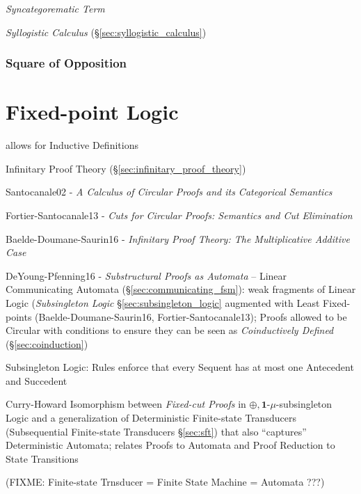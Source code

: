 \emph{Syncategorematic Term}

\emph{Syllogistic Calculus} (\S\ref{sec:syllogistic_calculus})



\subsubsection{Square of Opposition}\label{sec:square_of_opposition}



\section{Fixed-point Logic}\label{sec:fixedpoint_logic}

allows for Inductive Definitions

\fist Infinitary Proof Theory (\S\ref{sec:infinitary_proof_theory})

Santocanale02 - \emph{A Calculus of Circular Proofs and its
  Categorical Semantics}

Fortier-Santocanale13 - \emph{Cuts for Circular Proofs: Semantics and
  Cut Elimination}

Baelde-Doumane-Saurin16 - \emph{Infinitary Proof Theory: The
  Multiplicative Additive Case}

\asterism

DeYoung-Pfenning16 - \emph{Substructural Proofs as Automata} -- Linear
Communicating Automata (\S\ref{sec:communicating_fsm}): weak
fragments of Linear Logic (\emph{Subsingleton Logic}
\S\ref{sec:subsingleton_logic} augmented with Least Fixed-points
(Baelde-Doumane-Saurin16, Fortier-Santocanale13); Proofs allowed to be
Circular with conditions to ensure they can be seen as
\emph{Coinductively Defined} (\S\ref{sec:coinduction})

Subsingleton Logic: Rules enforce that every Sequent has at most one
Antecedent and Succedent

Curry-Howard Isomorphism between \emph{Fixed-cut Proofs} in
$\oplus,\mathbf{1}$-$\mu$-subsingleton Logic and a generalization of
Deterministic Finite-state Transducers (Subsequential Finite-state
Transducers \S\ref{sec:sft}) that also ``captures'' Deterministic
Automata; relates Proofs to Automata and Proof Reduction to State
Transitions

(FIXME: Finite-state Trnsducer = Finite State Machine = Automata ???)

